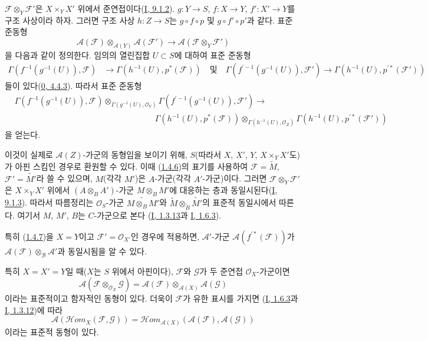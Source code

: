 $\mathcal{F}\otimes_Y\mathcal{F}'$은 $X\times_Y X'$ 위에서
준연접이다(\hyperref[I.9.1.2-ko]{I, 9.1.2}).
$g:Y\to S$, $f:X\to Y$, $f':X'\to Y$를 구조 사상이라 하자.
그러면 구조 사상
$h:Z\to S$는 $g\circ f\circ p$ 및 $g\circ f'\circ p'$과 같다.
표준 준동형
\[
  \mathcal{A}(\mathcal{F})\otimes_{\mathcal{A}(Y)}\mathcal{A}(\mathcal{F}')
  \longrightarrow \mathcal{A}(\mathcal{F}\otimes_Y\mathcal{F}')
\]
을 다음과 같이 정의한다. 임의의 열린집합 $U\subset S$에 대하여
표준 준동형
\[
  \begin{aligned}
  \Gamma(f^{-1}(g^{-1}(U)),\mathcal{F})
  &\longrightarrow \Gamma(h^{-1}(U),p^*(\mathcal{F}))\quad\text{및}\quad
  \Gamma(f^{\prime-1}(g^{-1}(U)),\mathcal{F}')
  \longrightarrow \Gamma(h^{-1}(U),p^{\prime*}(\mathcal{F}'))
  \end{aligned}
\]
들이 있다(\hyperref[0.4.4.3-ko]{0, 4.4.3}). 따라서 표준 준동형
\[
  \begin{aligned}
  &\Gamma(f^{-1}(g^{-1}(U)),\mathcal{F})
    \otimes_{\Gamma(g^{-1}(U),\mathcal{O}_Y)}
    \Gamma(f^{\prime-1}(g^{-1}(U)),\mathcal{F}')\longrightarrow\\
  &\hspace{17em}
    \Gamma(h^{-1}(U),p^*(\mathcal{F}))
    \otimes_{\Gamma(h^{-1}(U),\mathcal{O}_Z)}
    \Gamma(h^{-1}(U),p^{\prime*}(\mathcal{F}'))
  \end{aligned}
\]
을 얻는다.

이것이 실제로 $\mathcal{A}(Z)$-가군의 동형임을 보이기 위해,
$S$(따라서 $X$, $X'$, $Y$, $X\times_Y X'$도)가 아핀 스킴인
경우로 환원할 수 있다. 이때
(\hyperref[II.1.4.6-ko]{1.4.6})의 표기를 사용하여
$\mathcal{F}=\widetilde{M}$, $\mathcal{F}'=\widetilde{M'}$라 쓸 수
있으며, $M$(각각 $M'$)은 $A$-가군(각각 $A'$-가군)이다. 그러면
$\mathcal{F}\otimes_Y\mathcal{F}'$은 $X\times_Y X'$ 위에서
$(A\otimes_B A')$-가군 $M\otimes_B M'$에 대응하는 층과
동일시된다(\hyperref[I.9.1.3-ko]{I, 9.1.3}). 따라서 따름정리는
$\mathcal{O}_S$-가군 $\widetilde{M\otimes_B M'}$와
$\widetilde{M}\otimes_{\widetilde{B}}\widetilde{M'}$의 표준적
동일시에서 따른다. 여기서 $M$, $M'$, $B$는 $C$-가군으로 본다
(\hyperref[I.1.3.13-ko]{I, 1.3.13}과
\hyperref[I.1.6.3-ko]{I, 1.6.3}).

특히 (\hyperref[II.1.4.7-ko]{1.4.7})을 $X=Y$이고
$\mathcal{F}'=\mathcal{O}_{X'}$인 경우에 적용하면,
$\mathcal{A}'$-가군 $\mathcal{A}(f^{\prime*}(\mathcal{F}))$가
$\mathcal{A}(\mathcal{F})\otimes_{\mathcal{B}}\mathcal{A}'$과
동일시됨을 알 수 있다.

\begin{env}[1.4.8]
\label{II.1.4.8-ko}
특히 $X=X'=Y$일 때($X$는 $S$ 위에서 아핀이다),
$\mathcal{F}$와 $\mathcal{G}$가 두 준연접
$\mathcal{O}_X$-가군이면
\[
  \mathcal{A}(\mathcal{F}\otimes_{\mathcal{O}_X}\mathcal{G})
  =\mathcal{A}(\mathcal{F})\otimes_{\mathcal{A}(X)}\mathcal{A}(\mathcal{G})
  \tag{1.4.8.1}\label{II.1.4.8.1-ko}
\]
이라는 표준적이고 함자적인 동형이 있다. 더욱이 $\mathcal{F}$가
유한 표시를 가지면
(\hyperref[I.1.6.3-ko]{I, 1.6.3}과
\hyperref[I.1.3.12-ko]{I, 1.3.12})에 따라
\[
  \mathcal{A}(\mathcal{H}om_X(\mathcal{F},\mathcal{G}))
  =\mathcal{H}om_{\mathcal{A}(X)}
    (\mathcal{A}(\mathcal{F}),\mathcal{A}(\mathcal{G}))
  \tag{1.4.8.2}\label{II.1.4.8.2-ko}
\]
이라는 표준적 동형이 있다.
\end{env}

